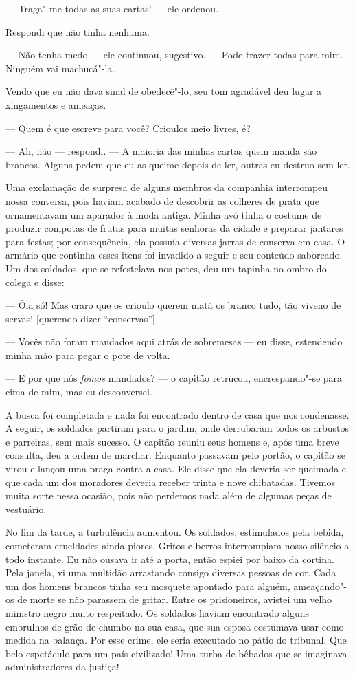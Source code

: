 --- Traga"-me todas as suas cartas! --- ele ordenou.

Respondi que não tinha nenhuma.

--- Não tenha medo --- ele continuou, sugestivo. --- Pode trazer todas
para mim. Ninguém vai machucá"-la.

Vendo que eu não dava sinal de obedecê"-lo, seu tom agradável deu lugar a
xingamentos e ameaças.

--- Quem é que escreve para você? Crioulos meio livres, é?

--- Ah, não --- respondi. --- A maioria das minhas cartas quem manda são
brancos. Alguns pedem que eu as queime depois de ler, outras eu destruo
sem ler.

Uma exclamação de surpresa de alguns
membros da companhia interrompeu nossa conversa, pois haviam acabado de
descobrir as colheres de prata que ornamentavam um aparador à moda
antiga. Minha avó tinha o costume de produzir compotas de frutas para
muitas senhoras da cidade e preparar jantares para festas; por
consequência, ela possuía diversas jarras de conserva em casa. O armário
que continha esses itens foi invadido a seguir e seu conteúdo saboreado.
Um dos soldados, que se refestelava nos potes, deu um tapinha no ombro
do colega e disse:

--- Óia só! Mas craro que os crioulo querem matá os branco tudo, tão
viveno de servas! {[}querendo dizer ``conservas''{]}

--- Vocês não foram mandados aqui atrás de sobremesas --- eu disse,
estendendo minha mão para pegar o pote de volta.

--- E por que nós \emph{fomos}
mandados? --- o capitão retrucou, encrespando"-se para cima de mim, mas
eu desconversei.

A busca foi completada e nada foi
encontrado dentro de casa que nos condenasse. A seguir, os soldados
partiram para o jardim, onde derrubaram todos os arbustos e parreiras,
sem mais sucesso. O capitão reuniu seus homens e, após uma breve
consulta, deu a ordem de marchar. Enquanto passavam pelo portão, o
capitão se virou e lançou uma praga contra a casa. Ele disse que ela
deveria ser queimada e que cada um dos moradores deveria receber trinta
e nove chibatadas. Tivemos muita sorte nessa ocasião, pois não perdemos
nada além de algumas peças de vestuário.

No fim da tarde, a turbulência
aumentou. Os soldados, estimulados pela bebida, cometeram crueldades
ainda piores. Gritos e berros interrompiam nosso silêncio a todo
instante. Eu não ousava ir até a porta, então espiei por baixo da
cortina. Pela janela, vi uma multidão arrastando consigo diversas
pessoas de cor. Cada um dos homens brancos tinha seu mosquete apontado
para alguém, ameaçando"-os de morte se não parassem de gritar. Entre os
prisioneiros, avistei um velho ministro negro muito respeitado. Os
soldados haviam encontrado alguns embrulhos de grão de chumbo na sua
casa, que sua esposa costumava usar como medida na balança. Por esse
crime, ele seria executado no pátio do tribunal. Que belo espetáculo
para um país civilizado! Uma turba de bêbados que se imaginava
administradores da justiça!

